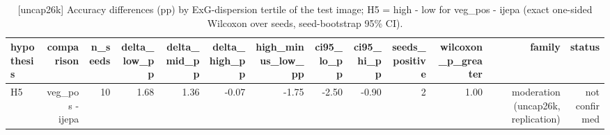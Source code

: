 \begin{table}[t]
\centering
\small
\caption{[uncap26k] Accuracy differences (pp) by ExG-dispersion tertile of the test image; H5 = high - low for veg\_pos - ijepa (exact one-sided Wilcoxon over seeds, seed-bootstrap 95\% CI).}
\label{tab:moderation}
\begin{tabular}{lrrrrrrrrrrrr}
\toprule
hypothesis & comparison & n\_seeds & delta\_low\_pp & delta\_mid\_pp & delta\_high\_pp & high\_minus\_low\_pp & ci95\_lo\_pp & ci95\_hi\_pp & seeds\_positive & wilcoxon\_p\_greater & family & status \\
\midrule
H5 & veg\_pos - ijepa & 10 & 1.68 & 1.36 & -0.07 & -1.75 & -2.50 & -0.90 & 2 & 1.00 & moderation (uncap26k, replication) & not confirmed \\
\bottomrule
\end{tabular}
\end{table}
